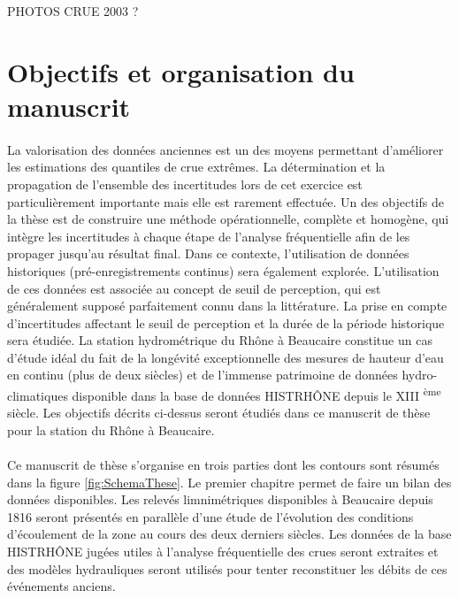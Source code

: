\documentclass[11pt]{article}
\begin{document}
	PHOTOS CRUE 2003 ?

	\section{Objectifs et organisation du manuscrit}
	
%

	\paragraph{} La valorisation des données anciennes est un des moyens permettant d'améliorer les estimations des quantiles de crue extrêmes. La détermination et la propagation de l'ensemble des incertitudes lors de cet exercice est particulièrement importante mais elle est rarement effectuée. Un des objectifs de la thèse est de construire une méthode opérationnelle, complète et homogène, qui intègre les incertitudes à chaque étape de l'analyse fréquentielle afin de les propager jusqu'au résultat final. Dans ce contexte, l'utilisation de données historiques (pré-enregistrements continus) sera également explorée. L'utilisation de ces données est associée au concept de seuil de perception, qui est généralement supposé parfaitement connu dans la littérature. La prise en compte d'incertitudes affectant le seuil de perception et la durée de la période historique sera étudiée. La station hydrométrique du Rhône à Beaucaire constitue un cas d'étude idéal du fait de la longévité exceptionnelle des mesures de hauteur d'eau en continu (plus de deux siècles) et de l'immense patrimoine de données hydro-climatiques disponible dans la base de données HISTRHÔNE depuis le XIII \textsuperscript{ème} siècle. Les objectifs décrits ci-dessus seront étudiés dans ce manuscrit de thèse pour la station du Rhône à Beaucaire.
	
	\paragraph{} Ce manuscrit de thèse s'organise en trois parties dont les contours sont résumés dans la figure \ref{fig:SchemaThese}. Le premier chapitre permet de faire un bilan des données disponibles. Les relevés limnimétriques disponibles à Beaucaire depuis 1816  seront présentés en parallèle d'une étude de l'évolution des conditions d'écoulement de la zone au cours des deux derniers siècles. Les données de la base HISTRHÔNE jugées utiles à l'analyse fréquentielle des crues seront extraites et des modèles hydrauliques seront utilisés pour tenter reconstituer les débits de ces événements anciens. 
	
\end{document}
